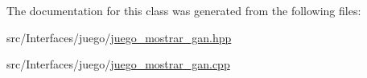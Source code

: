 The documentation for this class was generated from the following files\+:\begin{DoxyCompactItemize}
\item 
src/\+Interfaces/juego/\hyperlink{juego__mostrar__gan_8hpp}{juego\+\_\+mostrar\+\_\+gan.\+hpp}\item 
src/\+Interfaces/juego/\hyperlink{juego__mostrar__gan_8cpp}{juego\+\_\+mostrar\+\_\+gan.\+cpp}\end{DoxyCompactItemize}
